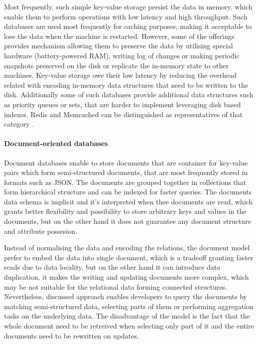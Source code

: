 Most frequently, such simple key-value storage persist the data in memory, which enable them to perform operations with low latency and high throughput. Such databases are used most frequently for caching purposes, making it acceptable to lose the data when the machine is restarted. However, some of the offerings provides mechanism allowing them to preserve the data by utilising special hardware (battery-powered RAM), writing log of changes or making periodic snapshots preserved on the disk or replicate the in-memory state to other machines. Key-value storage owe their low latency by reducing the overhead related with encoding in-memory data structures that need to be written to the disk. Additionally some of such databases provide additional data structures such as priority queues or sets, that are harder to implement leveraging disk based indexes. Redis and Memcached can be distinguished as representatives of that category \cite{DesignDataIntensiveApplications}. 

\paragraph*{Document-oriented databases}

Document databases enable to store documents that are container for key-value pairs which form semi-structured documents, that are most frequently stored in formats such as JSON. The documents are grouped together in collections that form hierarchical structure and can be indexed for faster queries. The documents data schema is implicit and it's interpreted when thee documents are read, which grants better flexibility and possibility to store arbitrary keys and values in the documents, but on the other hand it does not guarantee any document structure and attribute possesion.

Instead of normalising the data and encoding the relations, the document model prefer to embed the data into single document, which is a tradeoff granting faster reads due to data locality, but on the other hand it can introduce data duplication, it makes the writing and updating documents more complex, which may be not suitable for the relational data forming connected structures. Nevertheless, discussed approach enables developers to query the documents by matching semi-structured data, selecting parts of them or performing aggregation tasks on the underlying data. 
The disadvantage of the model is the fact that the whole document need to be retreived when selecting only part of it and the entire documents need to be rewritten on updates.


